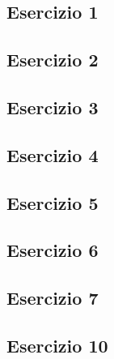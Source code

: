 \vspace{0.8cm}
\subsection{\textbf{Esercizio 1}}

\vspace{1cm}
\subsection{\textbf{Esercizio 2}}

\vspace{1cm}
\subsection{\textbf{Esercizio 3}}

\vspace{1cm}
\subsection{\textbf{Esercizio 4}}

\vspace{1cm}
\subsection{\textbf{Esercizio 5}}

\vspace{1cm}
\subsection{\textbf{Esercizio 6}}

\vspace{1cm}
\subsection{\textbf{Esercizio 7}}

\vspace{1cm}
\subsection{\textbf{Esercizio 10}}

